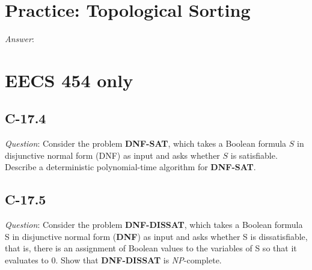 \documentclass[11pt]{article}
\begin{document}
\section{Practice: Topological Sorting}
\noindent \emph{Answer}:
\section{EECS 454 only}
\subsection{C-17.4}
\noindent \emph{Question}: Consider the problem \textbf{DNF-SAT}, which takes a Boolean formula $S$ in disjunctive normal form (DNF) as input and asks whether $S$ is satisfiable. Describe a deterministic polynomial-time algorithm for \textbf{DNF-SAT}.
\subsection{C-17.5}
\noindent \emph{Question}: Consider the problem \textbf{DNF-DISSAT}, which takes a Boolean formula S in disjunctive normal form (\textbf{DNF}) as input and asks whether S is dissatisfiable, that is, there is an assignment of Boolean values to the variables of S so that it evaluates to 0. Show that \textbf{DNF-DISSAT} is \emph{NP}-complete.
\end{document}
